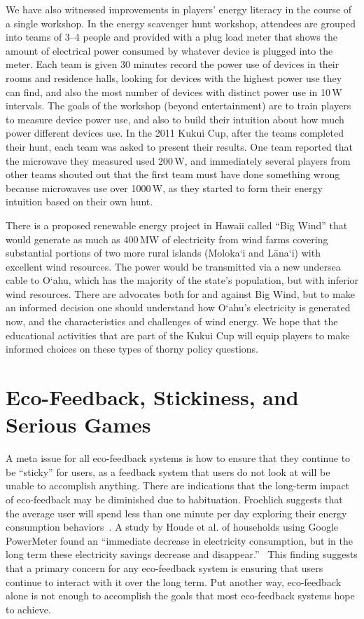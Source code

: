 \documentclass{sigchi}
\begin{document}
We have also witnessed improvements in players' energy literacy in the course of a single workshop. In the energy scavenger hunt workshop, attendees are grouped into teams of 3--4 people and provided with a plug load meter that shows the amount of electrical power consumed by whatever device is plugged into the meter. Each team is given 30 minutes record the power use of devices in their rooms and residence halls, looking for devices with the highest power use they can find, and also the most number of devices with distinct power use in 10\,W intervals. The goals of the workshop (beyond entertainment) are to train players to measure device power use, and also to build their intuition about how much power different devices use. In the 2011 Kukui Cup, after the teams completed their hunt, each team was asked to present their results. One team reported that the microwave they measured used 200\,W, and immediately several players from other teams shouted out that the first team must have done something wrong because microwaves use over 1000\,W, as they started to form their energy intuition based on their own hunt.

There is a proposed renewable energy project in Hawaii called ``Big Wind'' that would generate as much as 400\,MW of electricity from wind farms covering substantial portions of two more rural islands (Moloka`i and L\=ana`i) with excellent wind resources. The power would be transmitted via a new undersea cable to O`ahu, which has the majority of the state's population, but with inferior wind resources. There are advocates both for and against Big Wind, but to make an informed decision one should understand how O`ahu's electricity is generated now, and the characteristics and challenges of wind energy. We hope that the educational activities that are part of the Kukui Cup will equip players to make informed choices on these types of thorny policy questions.


\section{Eco-Feedback, Stickiness, and Serious Games}

A meta issue for all eco-feedback systems is how to ensure that they continue to be ``sticky'' for users, as a feedback system that users do not look at will be unable to accomplish anything. There are indications that the long-term impact of eco-feedback may be diminished due to habituation. Froehlich suggests that the average user will spend less than one minute per day exploring their energy consumption behaviors~\cite{Froehlich2010-BECC}. A study by Houde et al. of households using Google PowerMeter found an ``immediate decrease in electricity consumption, but in the long term these electricity savings decrease and disappear.''~\cite{Houde2013-powermeter} This finding suggests that a primary concern for any eco-feedback system is ensuring that users continue to interact with it over the long term. Put another way, eco-feedback alone is not enough to accomplish the goals that most eco-feedback systems hope to achieve.
\end{document}
